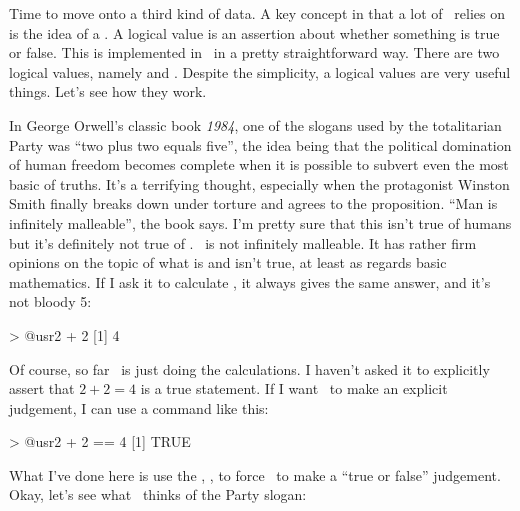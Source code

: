 Time to move onto a third kind of data. A key concept in that a lot of \R\ relies on is the idea of a . A logical value is an assertion about whether something is true or false. This is implemented in \R\ in a pretty straightforward way. There are two logical values, namely  and . Despite the simplicity, a logical values are very useful things. Let's see how they work.


In George Orwell's classic book {\it 1984}, one of the slogans used by the totalitarian Party was ``two plus two equals five'', the idea being that the political domination of human freedom becomes complete when it is possible to subvert even the most basic of truths. It's a terrifying thought, especially when the protagonist Winston Smith finally breaks down under torture and agrees to the proposition. ``Man is infinitely malleable'', the book says. I'm pretty sure that this isn't true of humans but it's definitely not true of \R. \R\ is not infinitely malleable. It has rather firm opinions on the topic of what is and isn't true, at least as regards basic mathematics. If I ask it to calculate , it always gives the same answer, and it's not bloody 5:
\begin{rblock1}
> @usr{2 + 2}
[1] 4
\end{rblock1}
Of course, so far \R\ is just doing the calculations. I haven't asked it to explicitly assert that $2+2 = 4$ is a true statement. If I want \R\ to make an explicit judgement, I can use a command like this: 
\begin{rblock1}
> @usr{2 + 2 == 4}
[1] TRUE
\end{rblock1}
What I've done here is use the , \rtext{==}, to force \R\ to make a ``true or false'' judgement. Okay, let's see what \R\ thinks of the Party slogan:

